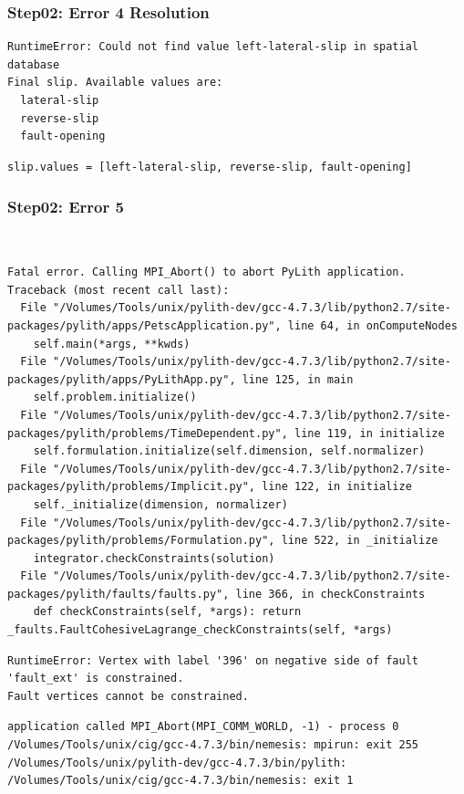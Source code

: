 \documentclass{beamer}
\begin{document}
\begin{frame}[fragile]
  \frametitle{Step02: Error 4 Resolution}

\begin{lstlisting}
RuntimeError: Could not find value left-lateral-slip in spatial database
Final slip. Available values are:
  lateral-slip
  reverse-slip
  fault-opening
\end{lstlisting}\pause
{}
\begin{lstlisting}
slip.values = [left-lateral-slip, reverse-slip, fault-opening]
\end{lstlisting}

\end{frame}


\begin{frame}[fragile]
  \frametitle{Step02: Error 5}

\\
\begin{lstlisting}
Fatal error. Calling MPI_Abort() to abort PyLith application.
Traceback (most recent call last):
  File "/Volumes/Tools/unix/pylith-dev/gcc-4.7.3/lib/python2.7/site-packages/pylith/apps/PetscApplication.py", line 64, in onComputeNodes
    self.main(*args, **kwds)
  File "/Volumes/Tools/unix/pylith-dev/gcc-4.7.3/lib/python2.7/site-packages/pylith/apps/PyLithApp.py", line 125, in main
    self.problem.initialize()
  File "/Volumes/Tools/unix/pylith-dev/gcc-4.7.3/lib/python2.7/site-packages/pylith/problems/TimeDependent.py", line 119, in initialize
    self.formulation.initialize(self.dimension, self.normalizer)
  File "/Volumes/Tools/unix/pylith-dev/gcc-4.7.3/lib/python2.7/site-packages/pylith/problems/Implicit.py", line 122, in initialize
    self._initialize(dimension, normalizer)
  File "/Volumes/Tools/unix/pylith-dev/gcc-4.7.3/lib/python2.7/site-packages/pylith/problems/Formulation.py", line 522, in _initialize
    integrator.checkConstraints(solution)
  File "/Volumes/Tools/unix/pylith-dev/gcc-4.7.3/lib/python2.7/site-packages/pylith/faults/faults.py", line 366, in checkConstraints
    def checkConstraints(self, *args): return _faults.FaultCohesiveLagrange_checkConstraints(self, *args)
\end{lstlisting}
\begin{lstlisting}
RuntimeError: Vertex with label '396' on negative side of fault 'fault_ext' is constrained.
Fault vertices cannot be constrained.
\end{lstlisting}
\begin{lstlisting}
application called MPI_Abort(MPI_COMM_WORLD, -1) - process 0
/Volumes/Tools/unix/cig/gcc-4.7.3/bin/nemesis: mpirun: exit 255
/Volumes/Tools/unix/pylith-dev/gcc-4.7.3/bin/pylith: /Volumes/Tools/unix/cig/gcc-4.7.3/bin/nemesis: exit 1
\end{lstlisting}

\end{frame}
\end{document}
